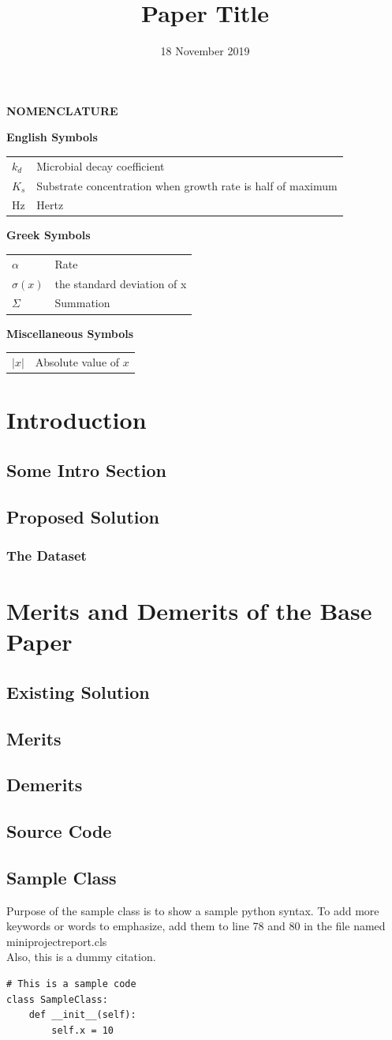 \documentclass{projectreport}
\title{Paper Title}
\date{18 November 2019}
\newcommand{\nomenclature}{
	\begin{center}
		\Large \textbf{NOMENCLATURE}\\
	\end{center}
	\begin{table}[h]
		\Large \textbf{English Symbols}\\
		\begin{tabular}{ll}
			$k_d$&Microbial decay coefficient\\
			$K_s$&Substrate concentration when growth rate is half of maximum\\
			Hz&Hertz\\
		\end{tabular}
	\end{table}
	\begin{table}[h]
		\Large \textbf{Greek Symbols}\\
		\begin{tabular}{ll}
			$\alpha$&Rate\\
			$\sigma(x)$&the standard deviation of x\\
			$\Sigma$&Summation\\
		\end{tabular}
	\end{table}
	\begin{table}[h]
		\Large \textbf{Miscellaneous Symbols}\\
		\begin{tabular}{ll}
			$|x|$&Absolute value of $x$\\
		\end{tabular}
	\end{table}
}
\begin{document}
	\makereportfirstpage
	\bonafide
	\declaration
	\acknowledgement{\lipsum[1]}
	\newpage
	\tableofcontents
	\newpage
	\listoffigures
	\newpage
	\listoftables
	\newpage
	\nomenclature
	\newpage
	\newpage
	\newpage
	\setcounter{page}{1}
	\chapter{Introduction}
		\setcounter{chapter}{1}
		\section{Some Intro Section}
		\lipsum[3]
		\section{Proposed Solution}
		\lipsum[4]
		\subsection{The Dataset}
		\lipsum[5]
	\chapter{Merits and Demerits of the Base Paper}
		\section{Existing Solution}
		\lipsum[6]
		\section{Merits}
		\lipsum[7]
		\section{Demerits}
		\lipsum[8]
	\begin{hyphenatedcode}
	\chapter{Source Code}
	\section{Sample Class}
	Purpose of the sample class is to show a sample python syntax. To add more keywords or words to emphasize, add them to line 78 and 80 in the file named miniprojectreport.cls\\Also, this\cite{7457930} is a dummy citation.\\
\begin{lstlisting}
# This is a sample code
class SampleClass:
    def __init__(self):
        self.x = 10	
\end{lstlisting}
	\end{hyphenatedcode}
	\newpage
\end{document}
